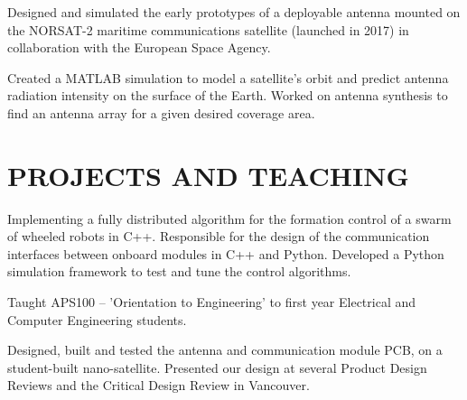 \documentclass{ResumeTemplate}
\begin{document}
	\workitemsone
	{Designed and simulated the early prototypes of a deployable antenna mounted on the NORSAT-2 maritime communications satellite (launched in 2017) in collaboration with the European Space Agency.}
	
	
	\workitemsone
	{Created a MATLAB simulation to model a satellite's orbit and predict antenna radiation intensity on the surface of the Earth. Worked on antenna synthesis to find an antenna array for a given desired coverage area.}
	
	\section{PROJECTS AND TEACHING}
	

	\workitemsthree
	{Implementing a fully distributed algorithm for the formation control of a swarm of wheeled robots in C++.}
	{Responsible for the design of the communication interfaces between onboard modules in C++ and Python.}
	{Developed a Python simulation framework to test and tune the control algorithms. }
	

	\workitemsone
	{Taught APS100 -- 'Orientation to Engineering' to first year Electrical and Computer Engineering students.}
	

	\workitemstwo
	{Designed, built and tested the antenna and communication module PCB, on a student-built nano-satellite.}
	{Presented our design at several Product Design Reviews and the Critical Design Review in Vancouver.}

	
\end{document}
